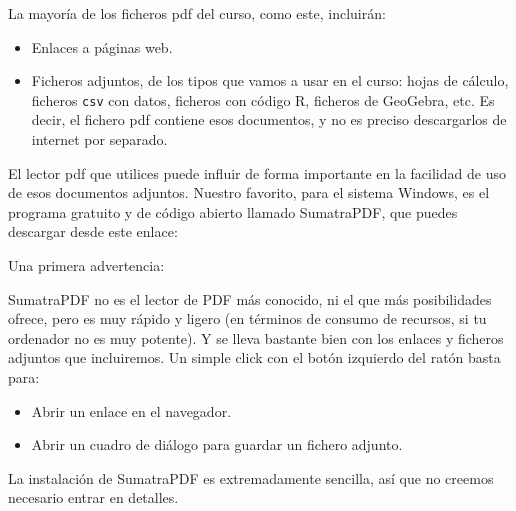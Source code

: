 \documentclass[10pt,a4paper]{article}\usepackage[]{graphicx}\usepackage[]{color}
\newcounter {cont01}
\begin{document}
La mayoría de los ficheros pdf del curso, como este, incluirán:
\begin{itemize}
  \item Enlaces a páginas web.
  \item Ficheros adjuntos, de los tipos que vamos a usar en el curso: hojas de cálculo, ficheros
      {\tt csv}  con datos, ficheros con código R, ficheros de GeoGebra, etc.  Es decir, el
      fichero pdf contiene esos documentos, y no es preciso descargarlos de internet por
      separado.
\end{itemize}
El lector pdf que utilices puede influir de forma importante en la facilidad de uso de esos
documentos adjuntos. Nuestro favorito, para el sistema Windows, es el programa gratuito y de código
abierto llamado SumatraPDF, que puedes descargar desde este enlace:
\begin{center}
\end{center}

Una primera advertencia:
        \begin{center}
        \end{center}



SumatraPDF no es el lector de PDF más conocido, ni el que más posibilidades ofrece, pero es muy
rápido y ligero (en términos de consumo de recursos, si tu ordenador no es muy potente). Y se lleva
bastante bien con los enlaces y ficheros adjuntos que incluiremos. Un simple click con el botón
izquierdo del ratón basta para:
\begin{itemize}
  \item Abrir un enlace en el navegador.
  \item Abrir un cuadro de diálogo para guardar un fichero adjunto.
\end{itemize}
La instalación de SumatraPDF es extremadamente sencilla, así que no creemos necesario entrar en
detalles.
\end{document}
